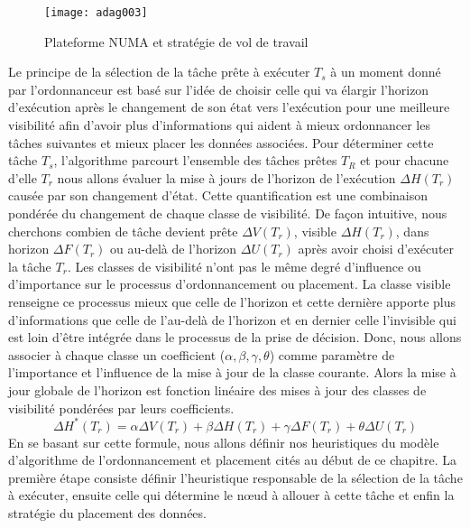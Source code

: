 \begin{figure}  %
\texttt{[image: adag003]}
\centering
\caption{Plateforme NUMA et stratégie de vol de travail}
\label{fig:hm001}
\end{figure}
%
Le principe de la sélection de la tâche prête à exécuter $T_s$ à un moment donné par l'ordonnanceur est basé sur l'idée de choisir celle qui va élargir l'horizon d'exécution après le changement de son état vers l'exécution pour une meilleure visibilité afin d'avoir plus d'informations qui aident à mieux ordonnancer les tâches suivantes et mieux placer les données associées. Pour déterminer cette tâche $T_s$, l'algorithme parcourt l'ensemble des tâches prêtes $T_R$ et pour chacune d'elle $T_r$ nous allons évaluer la mise à jours de l'horizon de l'exécution $\Delta H(T_r)$ causée par son changement d'état. Cette quantification est une combinaison pondérée du changement de chaque classe de visibilité. De façon intuitive, nous cherchons combien de tâche devient prête $\Delta V(T_r)$, visible $\Delta H(T_r)$, dans horizon $\Delta F(T_r)$ ou au-delà de l'horizon $\Delta U(T_r)$ après avoir choisi d'exécuter la tâche $T_r$. Les classes de visibilité n'ont pas le même degré d'influence ou d'importance sur le processus d'ordonnancement ou placement. La classe visible renseigne ce processus mieux que celle de l'horizon et cette dernière apporte plus d'informations que celle de l'au-delà de l'horizon et en dernier celle l'invisible qui est loin d'être intégrée dans le processus de la prise de décision. Donc, nous allons associer à chaque classe un coefficient ($\alpha, \beta, \gamma, \theta$) comme paramètre de l'importance et l'influence de la mise à jour de la classe courante. Alors la mise à jour globale de l'horizon est fonction linéaire des mises à jour des classes de visibilité pondérées par leurs coefficients.
%
$$
\Delta H^*(T_r) = \alpha \Delta V(T_r) + \beta \Delta H(T_r) + \gamma \Delta F(T_r)  + \theta \Delta U(T_r) 
$$
%
En se basant sur cette formule, nous allons définir nos heuristiques du modèle d'algorithme de l'ordonnancement et placement cités au début de ce chapitre. La première étape consiste définir l'heuristique responsable de la sélection de la tâche à exécuter, ensuite celle qui détermine le nœud à allouer à cette tâche et enfin la stratégie du placement des données.

